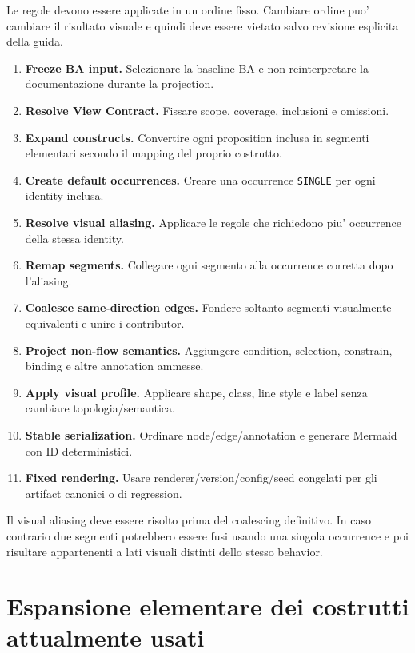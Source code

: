 \documentclass[11pt,a4paper]{article}
\begin{document}
Le regole devono essere applicate in un ordine fisso. Cambiare ordine puo' cambiare il risultato visuale e quindi deve essere vietato salvo revisione esplicita della guida.

\begin{enumerate}
  \item \textbf{Freeze BA input.} Selezionare la baseline BA e non reinterpretare la documentazione durante la projection.
  \item \textbf{Resolve View Contract.} Fissare scope, coverage, inclusioni e omissioni.
  \item \textbf{Expand constructs.} Convertire ogni proposition inclusa in segmenti elementari secondo il mapping del proprio costrutto.
  \item \textbf{Create default occurrences.} Creare una occurrence \texttt{SINGLE} per ogni identity inclusa.
  \item \textbf{Resolve visual aliasing.} Applicare le regole che richiedono piu' occurrence della stessa identity.
  \item \textbf{Remap segments.} Collegare ogni segmento alla occurrence corretta dopo l'aliasing.
  \item \textbf{Coalesce same-direction edges.} Fondere soltanto segmenti visualmente equivalenti e unire i contributor.
  \item \textbf{Project non-flow semantics.} Aggiungere condition, selection, constrain, binding e altre annotation ammesse.
  \item \textbf{Apply visual profile.} Applicare shape, class, line style e label senza cambiare topologia/semantica.
  \item \textbf{Stable serialization.} Ordinare node/edge/annotation e generare Mermaid con ID deterministici.
  \item \textbf{Fixed rendering.} Usare renderer/version/config/seed congelati per gli artifact canonici o di regression.
\end{enumerate}

\begin{ddtaprinciple}[title={Aliasing prima del coalescing}]
Il visual aliasing deve essere risolto prima del coalescing definitivo. In caso contrario due segmenti potrebbero essere fusi usando una singola occurrence e poi risultare appartenenti a lati visuali distinti dello stesso behavior.
\end{ddtaprinciple}

\clearpage
\section{Espansione elementare dei costrutti attualmente usati}
\end{document}

